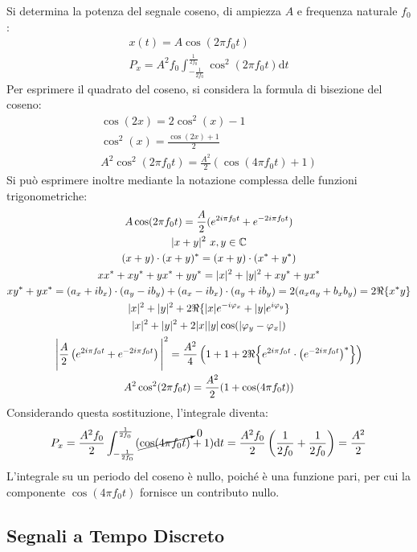 \documentclass{article}
\newcommand{\df}{\mathrm{d}}
\numberwithin{equation}{subsection}
\begin{document}
Si determina la potenza del segnale coseno, di ampiezza $A$ e frequenza naturale $f_0$:
\begin{gather*}
    x(t)=A\cos\left(2\pi f_0t\right)\\
    P_x=\displaystyle A^2f_0\int_{-\frac{1}{2f_0}}^{\frac{1}{2f_0}}\cos^2(2\pi f_0 t)\df t
\end{gather*}
Per esprimere il quadrato del coseno, si considera la formula di bisezione del coseno:
\begin{gather*}
    \cos(2x)=2\cos^2(x)-1\\
    \cos^2(x)=\displaystyle\frac{\cos(2x)+1}{2}\\
    A^2\cos^2(2\pi f_0t)=\displaystyle\frac{A^2}{2}(\cos(4\pi f_0t)+1)
\end{gather*}
Si può esprimere inoltre mediante la notazione complessa delle funzioni trigonometriche:
\begin{gather*}
    A\cos(2\pi f_0t)=\displaystyle\frac{A}{2}(e^{2i\pi f_0t}+e^{-2i\pi f_0t})\\
    |x+y|^2\,\,x,y\in\mathbb{C}\\
    (x+y)\cdot(x+y)^*=(x+y)\cdot(x^*+y^*)\\
    xx^*+xy^*+yx^*+yy^*=|x|^2+|y|^2+xy^*+yx^*\\
    xy^*+yx^*=(a_x+ib_x)\cdot(a_y-ib_y)+(a_x-ib_x)\cdot(a_y+ib_y)=2(a_xa_y+b_xb_y)=2\Re\{x^*y\}\\
    |x|^2+|y|^2+2\Re\{|x|e^{-i\varphi_x}+|y|e^{i\varphi_y}\}\\
    |x|^2+|y|^2+2|x||y|\cos(|\varphi_y-\varphi_x|)\\
    \Bigg|\displaystyle\frac{A}{2}\left(e^{2i\pi f_0t}+e^{-2i\pi f_0t}\right)\Bigg|^2=\frac{A^2}{4}\left(1+1+2\Re\Bigl\{e^{2i\pi f_0t}\cdot\left(e^{-2i\pi f_0t}\right)^*\Bigr\}\right)\\
    A^2\cos^2(2\pi f_0t)=\displaystyle\frac{A^2}{2}(1+\cos(4\pi f_0t))
\end{gather*}
Considerando questa sostituzione, l'integrale diventa:
\begin{equation*}
    P_x=\displaystyle\frac{A^2f_0}{2}\int_{-\frac{1}{2f_0}}^{\frac{1}{2f_0}}(\cancelto{0}{\cos(4\pi f_0 t)}+1)\df t=\frac{A^2f_0}{2}\left(\frac{1}{2f_0}+\frac{1}{2f_0}\right)=\frac{A^2}{2}
\end{equation*}
L'integrale su un periodo del coseno è nullo, poiché è una funzione pari, per cui la componente $\cos(4\pi f_0 t)$ fornisce un contributo nullo. 

\clearpage

\subsection{Segnali a Tempo Discreto}
\end{document}
